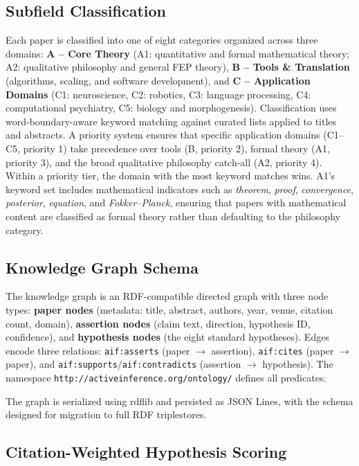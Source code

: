 \documentclass[
]{article}
\begin{document}
\subsection{Subfield Classification}\label{subfield-classification}

Each paper is classified into one of eight categories organized across
three domains: \textbf{A -- Core Theory} (A1: quantitative and formal
mathematical theory; A2: qualitative philosophy and general FEP theory),
\textbf{B -- Tools \& Translation} (algorithms, scaling, and software
development), and \textbf{C -- Application Domains} (C1: neuroscience,
C2: robotics, C3: language processing, C4: computational psychiatry, C5:
biology and morphogenesis). Classification uses word-boundary-aware
keyword matching against curated lists applied to titles and abstracts.
A priority system ensures that specific application domains (C1--C5,
priority 1) take precedence over tools (B, priority 2), formal theory
(A1, priority 3), and the broad qualitative philosophy catch-all (A2,
priority 4). Within a priority tier, the domain with the most keyword
matches wins. A1's keyword set includes mathematical indicators such as
\emph{theorem}, \emph{proof}, \emph{convergence}, \emph{posterior},
\emph{equation}, and \emph{Fokker--Planck}, ensuring that papers with
mathematical content are classified as formal theory rather than
defaulting to the philosophy category.

\subsection{Knowledge Graph Schema}\label{knowledge-graph-schema}

The knowledge graph is an RDF-compatible directed graph with three node
types: \textbf{paper nodes} (metadata: title, abstract, authors, year,
venue, citation count, domain), \textbf{assertion nodes} (claim text,
direction, hypothesis ID, confidence), and \textbf{hypothesis nodes}
(the eight standard hypotheses). Edges encode three relations:
\texttt{aif:asserts} (paper \(\to\) assertion), \texttt{aif:cites}
(paper \(\to\) paper), and
\texttt{aif:supports}/\texttt{aif:contradicts} (assertion \(\to\)
hypothesis). The namespace \texttt{http://activeinference.org/ontology/}
defines all predicates.

The graph is serialized using rdflib \citep{rdflib2023} and persisted as
JSON Lines, with the schema designed for migration to full RDF
triplestores.

\subsection{Citation-Weighted Hypothesis
Scoring}\label{citation-weighted-hypothesis-scoring}
\end{document}
